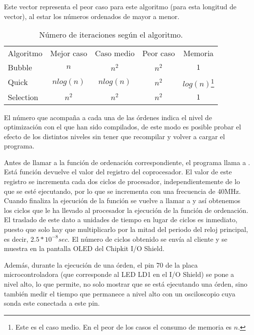 Este vector representa el peor caso para este algoritmo (para esta longitud de vector), al estar los números ordenados de mayor a menor.
\begin{table}[htb]
\begin{minipage}{\textwidth}
\begin{center}
\begin{tabular}{lcccc}
Algoritmo & Mejor caso & Caso medio & Peor caso & Memoria \\
Bubble    & \(n\) & \(n^2\) & \(n^2\) & \(1\) \\
Quick     & \(nlog(n)\) & \(nlog(n)\) & \(n^2\) & \(log(n)\)\footnote{Este es el caso medio. En el peor de los casos el consumo de memoria es \(n\).} \\
Selection & \(n^2\) & \(n^2\) & \(n^2\) & \(1\) \\
\end{tabular}
\end{center}
\caption{Número de iteraciones según el algoritmo.}
\label{table:algoritmos}
\end{minipage}
\end{table}

El número que acompaña a cada una de las órdenes indica el nivel de optimización con el que han sido compilados, de este modo es posible probar el efecto de los distintos niveles sin tener que recompilar y volver a cargar el programa. 

Antes de llamar a la función de ordenación correspondiente, el programa llama a . Está función devuelve el valor del registro  del coprocesador. El valor de este registro se incrementa cada dos ciclos de procesador, independientemente de lo que se esté ejecutando, por lo que se incrementa con una frecuencia de 40MHz. Cuando finaliza la ejecución de la función se vuelve a llamar a  y así obtenemos los ciclos que le ha llevado al procesador la ejecución de la función de ordenación. El traslado de este dato a unidades de tiempo en lugar de ciclos es inmediato, puesto que solo hay que multiplicarlo por la mitad del periodo del reloj principal, es decir, \(2.5*10^{-8}sec\).
El número de ciclos obtenido se envía al cliente y se muestra en la pantalla OLED del Chipkit I/O Shield.

Además, durante la ejecución de una órden, el pin 70 de la placa microcontroladora (que corresponde al LED LD1 en el I/O Shield) se pone a nivel alto, lo que permite, no solo mostrar que se está ejecutando una órden, sino también medir el tiempo que permanece a nivel alto con un osciloscopio cuya sonda este conectada a este pin. 


